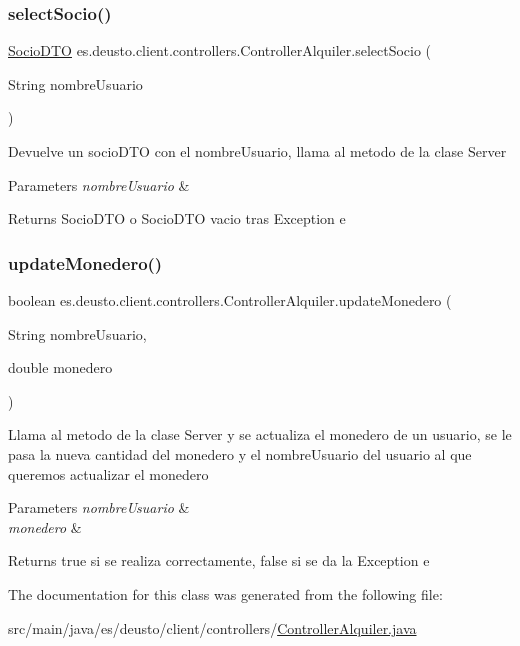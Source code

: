 \subsubsection{\texorpdfstring{selectSocio()}{selectSocio()}}
{\footnotesize\ttfamily \mbox{\hyperlink{classes_1_1deusto_1_1server_1_1dto_1_1_socio_d_t_o}{Socio\+D\+TO}} es.\+deusto.\+client.\+controllers.\+Controller\+Alquiler.\+select\+Socio (\begin{DoxyParamCaption}\item[{String}]{nombre\+Usuario }\end{DoxyParamCaption})}

Devuelve un socio\+D\+TO con el nombre\+Usuario, llama al metodo de la clase Server 
\begin{DoxyParams}{Parameters}
{\em nombre\+Usuario} & \\
\hline
\end{DoxyParams}
\begin{DoxyReturn}{Returns}
Socio\+D\+TO o Socio\+D\+TO vacio tras Exception e 
\end{DoxyReturn}
\mbox{\label{classes_1_1deusto_1_1client_1_1controllers_1_1_controller_alquiler_ac3685c7249af72df0049f28543e3769e}} 
\subsubsection{\texorpdfstring{updateMonedero()}{updateMonedero()}}
{\footnotesize\ttfamily boolean es.\+deusto.\+client.\+controllers.\+Controller\+Alquiler.\+update\+Monedero (\begin{DoxyParamCaption}\item[{String}]{nombre\+Usuario,  }\item[{double}]{monedero }\end{DoxyParamCaption})}

Llama al metodo de la clase Server y se actualiza el monedero de un usuario, se le pasa la nueva cantidad del monedero y el nombre\+Usuario del usuario al que queremos actualizar el monedero 
\begin{DoxyParams}{Parameters}
{\em nombre\+Usuario} & \\
\hline
{\em monedero} & \\
\hline
\end{DoxyParams}
\begin{DoxyReturn}{Returns}
true si se realiza correctamente, false si se da la Exception e 
\end{DoxyReturn}


The documentation for this class was generated from the following file\+:\begin{DoxyCompactItemize}
\item 
src/main/java/es/deusto/client/controllers/\mbox{\hyperlink{_controller_alquiler_8java}{Controller\+Alquiler.\+java}}\end{DoxyCompactItemize}

